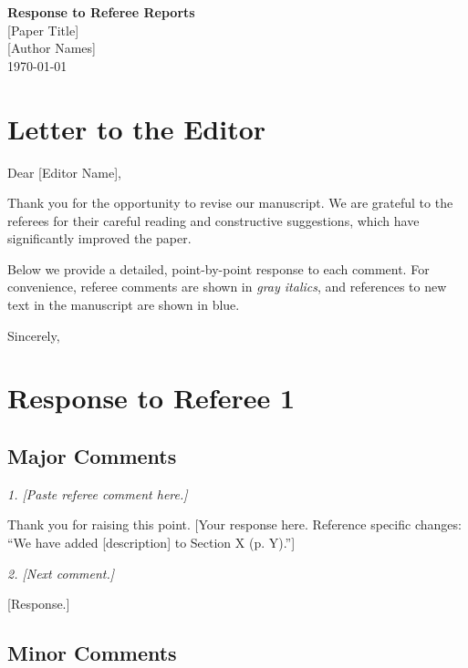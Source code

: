 \documentclass[12pt]{article}
\newcommand{\refcomment}[1]{%
    \medskip\noindent
    \textit{\color{refcomment}#1}%
    \medskip
}
\newcommand{\newtext}[1]{\textcolor{newtext}{#1}}
\begin{document}
\begin{center}
    {\Large\bfseries Response to Referee Reports}\\[0.5em]
    {\large [Paper Title]}\\[0.5em]
    [Author Names]\\
    \today
\end{center}

\bigskip

\section*{Letter to the Editor}

Dear [Editor Name],

Thank you for the opportunity to revise our manuscript. We are grateful to the referees for their careful reading and constructive suggestions, which have significantly improved the paper.

Below we provide a detailed, point-by-point response to each comment. For convenience, referee comments are shown in \textit{\color{refcomment}gray italics}, and references to new text in the manuscript are shown in \newtext{blue}.

\medskip
\noindent Sincerely,\\
[Author Names]

\newpage

\section*{Response to Referee 1}

\subsection*{Major Comments}

\refcomment{1. [Paste referee comment here.]}

Thank you for raising this point. [Your response here. Reference specific changes: ``We have added [description] to Section X (p. Y).'']

\refcomment{2. [Next comment.]}

[Response.]

\subsection*{Minor Comments}
\end{document}
